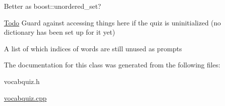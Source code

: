 Better as boost::unordered\_\-set? 

\begin{Desc}
\item[\hyperlink{todo__todo000006}{Todo}]Guard against accessing things here if the quiz is uninitialized (no dictionary has been set up for it yet) \end{Desc}
A list of which indices of words are still unused as prompts 

The documentation for this class was generated from the following files:\begin{DoxyCompactItemize}
\item 
vocabquiz.h\item 
\hyperlink{vocabquiz_8cpp}{vocabquiz.cpp}\end{DoxyCompactItemize}
